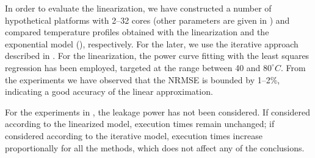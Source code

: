 In order to evaluate the linearization, we have constructed a number of
hypothetical platforms with 2--32 cores (other parameters are given in
) and compared temperature profiles obtained with the
linearization and the exponential model (), respectively. For
the later, we use the iterative approach described in
. For the linearization, the power curve
fitting with the least squares regression \cite{press2007} has been employed,
targeted at the range between 40 and $80^\circ C$. From the experiments we have
observed that the NRMSE is bounded by 1--2\%, indicating a good accuracy of the
linear approximation.

For the experiments in , the leakage power has
not been considered. If considered according to the linearized model, execution
times remain unchanged; if considered according to the iterative model,
execution times increase proportionally for all the methods, which does not
affect any of the conclusions.
